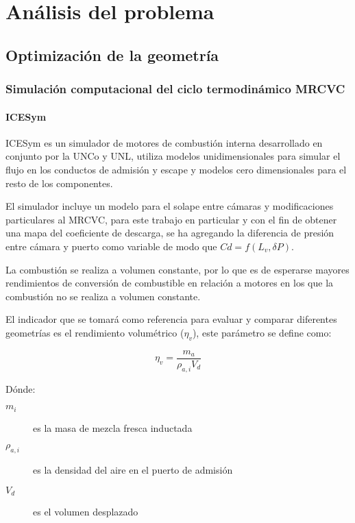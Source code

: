 \chapter{Análisis del problema}


\section{Optimización de la geometría}
\subsection{Simulación computacional del ciclo termodinámico MRCVC}
\subsubsection{ICESym}

ICESym \cite{icesym} es un simulador de motores de combustión interna
desarrollado en conjunto por la UNCo y UNL, utiliza modelos unidimensionales
para simular el flujo en los conductos de admisión y escape y modelos cero
dimensionales para el resto de los componentes.

El simulador incluye un modelo para el solape entre cámaras \cite{lopez16} y
modificaciones particulares al MRCVC, para este trabajo en particular  y con el
fin de obtener una mapa del coeficiente de descarga, se ha agregando la
diferencia de presión entre cámara y puerto como variable de modo que $Cd =
f(L_v, \delta P)$.

La combustión se realiza a volumen constante, por lo que es de esperarse
mayores rendimientos de conversión de combustible en relación a motores en los
que la combustión no se realiza a volumen constante.

El indicador que se tomará como referencia para evaluar y comparar diferentes
geometrías es el rendimiento volumétrico ($\eta_v$), este parámetro se define
como:

\begin{equation}
    \eta_v = \frac{m_a}{\rho_{a,i}V_d}
\end{equation}

Dónde:
\begin{description}
    \item[$m_i$] es la masa de mezcla fresca inductada
    \item[$\rho_{a,i}$] es la densidad del aire en el puerto de admisión
    \item[$V_d$] es el volumen desplazado
\end{description}

